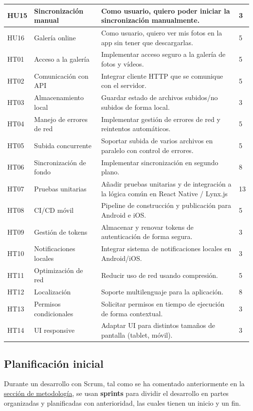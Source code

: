 \begin{tabularx}{\textwidth}{|l|l|>{\raggedright\arraybackslash}X|p{2cm}|}
    \hline
    HU15 & Sincronización manual & Como usuario, quiero poder iniciar la sincronización manualmente. & 3 \\
    \hline
    HU16 & Galería online & Como usuario, quiero ver mis fotos en la app sin tener que descargarlas. & 5 \\
    \hline
    HT01 & Acceso a la galería & Implementar acceso seguro a la galería de fotos y vídeos. & 5 \\
    \hline
    HT02 & Comunicación con API & Integrar cliente HTTP que se comunique con el servidor. & 5 \\
    \hline
    HT03 & Almacenamiento local & Guardar estado de archivos subidos/no subidos de forma local. & 3 \\
    \hline
    HT04 & Manejo de errores de red & Implementar gestión de errores de red y reintentos automáticos. & 5 \\
    \hline
    HT05 & Subida concurrente & Soportar subida de varios archivos en paralelo con control de errores. & 5 \\
    \hline
    HT06 & Sincronización de fondo & Implementar sincronización en segundo plano. & 8 \\
    \hline
    HT07 & Pruebas unitarias & Añadir pruebas unitarias y de integración a la lógica común en React Native / Lynx.js & 13 \\
    \hline
    HT08 & CI/CD móvil & Pipeline de construcción y publicación para Android e iOS. & 5 \\
    \hline
    HT09 & Gestión de tokens & Almacenar y renovar tokens de autenticación de forma segura. & 3 \\
    \hline
    HT10 & Notificaciones locales & Integrar sistema de notificaciones locales en Android/iOS. & 3 \\
    \hline
    HT11 & Optimización de red & Reducir uso de red usando compresión. & 5 \\
    \hline
    HT12 & Localización & Soporte multilenguaje para la aplicación. & 8 \\
    \hline
    HT13 & Permisos condicionales & Solicitar permisos en tiempo de ejecución de forma contextual. & 3 \\
    \hline
    HT14 & UI responsive & Adaptar UI para distintos tamaños de pantalla (tablet, móvil). & 3 \\
    \hline
\end{tabularx}


\subsection{Planificación inicial}
Durante un desarrollo con Scrum, tal como se ha comentado anteriormente en la \hyperref[sec:metodologia]{sección de metodología}, se usan \textbf{sprints} para dividir el desarrollo en partes organizadas y planificadas con anterioridad, las cuales tienen un inicio y un fin.

